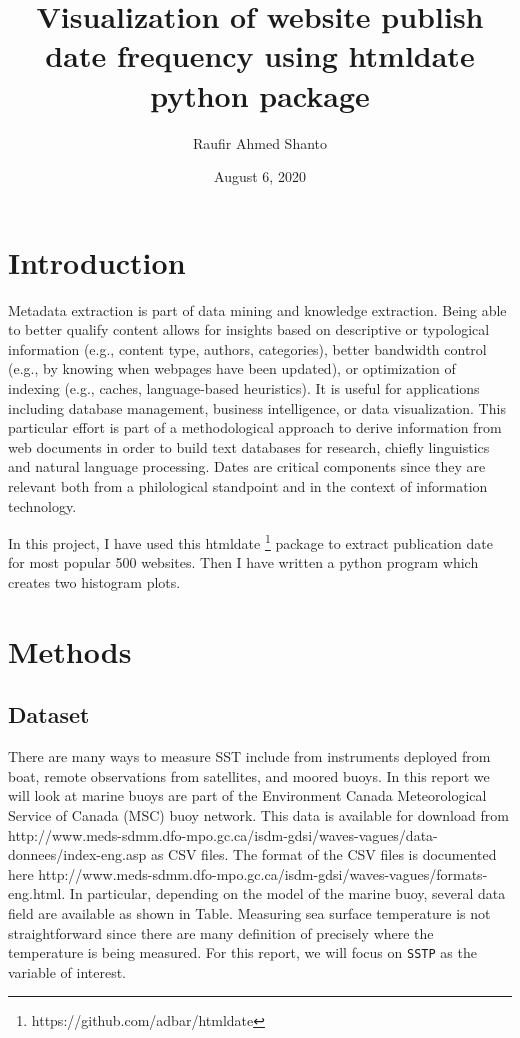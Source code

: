 \documentclass[12pt, letterpaper]{article}
\title{Visualization of website publish date frequency using htmldate python package}
\author{Raufir Ahmed Shanto}
\date{August 6, 2020}
\begin{document}
\maketitle

\section{Introduction}

Metadata extraction is part of data mining and knowledge extraction. Being able to better
qualify content allows for insights based on descriptive or typological information (e.g., content
type, authors, categories), better bandwidth control (e.g., by knowing when webpages
have been updated), or optimization of indexing (e.g., caches, language-based heuristics). It
is useful for applications including database management, business intelligence, or data visualization.
This particular effort is part of a methodological approach to derive information
from web documents in order to build text databases for research, chiefly linguistics and natural
language processing. Dates are critical components since they are relevant both from a
philological standpoint and in the context of information technology.

 
In this project, I have used this htmldate \footnote{https://github.com/adbar/htmldate} package to extract publication date for most popular 500 websites. Then I have written a python program which creates two histogram plots.

\section{Methods}

\subsection{Dataset}

There are many ways to measure SST include from instruments deployed from boat, remote observations from satellites, and moored buoys.  In this report we will look at marine buoys are part of the Environment Canada Meteorological Service of Canada (MSC) buoy network.  This data is available for download from http://www.meds-sdmm.dfo-mpo.gc.ca/isdm-gdsi/waves-vagues/data-donnees/index-eng.asp as CSV files. The format of the CSV files is documented here http://www.meds-sdmm.dfo-mpo.gc.ca/isdm-gdsi/waves-vagues/formats-eng.html. In particular, depending on the model of the marine buoy, several data field are available as shown in Table. Measuring sea surface temperature is not straightforward since there are many definition of precisely where the temperature is being measured.  For this report, we will focus on \texttt{SSTP} as the variable of interest.
\end{document}
